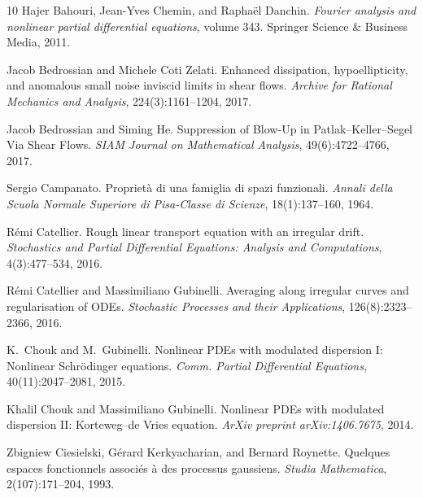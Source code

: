 \documentclass[11pt,oneside,reqno]{amsart}
\newcommand{\tmtextit}[1]{{{\itshape{#1}}}}
\numberwithin{equation}{section}
\begin{document}
\begin{thebibliography}{10}
  Hajer Bahouri, Jean-Yves Chemin, and  Rapha{\"e}l
  Danchin. {\newblock}\tmtextit{Fourier analysis and nonlinear partial
  differential equations},  volume  343. {\newblock}Springer Science \&
  Business Media, 2011.{\newblock}
  
  Jacob Bedrossian  and  Michele Coti
  Zelati. {\newblock}Enhanced dissipation, hypoellipticity, and anomalous
  small noise inviscid limits in shear flows. {\newblock}\tmtextit{Archive for
  Rational Mechanics and Analysis}, 224(3):1161--1204, 2017.{\newblock}
  
  Jacob Bedrossian  and  Siming He.
  {\newblock}Suppression of Blow-Up in Patlak--Keller--Segel Via Shear Flows.
  {\newblock}\tmtextit{SIAM Journal on Mathematical Analysis},
  49(6):4722--4766, 2017.{\newblock}
  
  Sergio Campanato. {\newblock}Propriet{\`a} di una
  famiglia di spazi funzionali. {\newblock}\tmtextit{Annali della Scuola
  Normale Superiore di Pisa-Classe di Scienze}, 18(1):137--160,
  1964.{\newblock}
  
  R{\'e}mi Catellier. {\newblock}Rough linear
  transport equation with an irregular drift. {\newblock}\tmtextit{Stochastics
  and Partial Differential Equations: Analysis and Computations},
  4(3):477--534, 2016.{\newblock}
  
  R{\'e}mi Catellier  and  Massimiliano
  Gubinelli. {\newblock}Averaging along irregular curves and regularisation of
  ODEs. {\newblock}\tmtextit{Stochastic Processes and their Applications},
  126(8):2323--2366, 2016.{\newblock}
  
  K.~Chouk  and  M.~Gubinelli.
  {\newblock}Nonlinear PDEs with modulated dispersion I: Nonlinear
  Schr{\"o}dinger equations. {\newblock}\tmtextit{Comm. Partial Differential
  Equations}, 40(11):2047--2081, 2015.{\newblock}
  
  Khalil Chouk  and  Massimiliano Gubinelli.
  {\newblock}Nonlinear PDEs with modulated dispersion II: Korteweg--de Vries
  equation. {\newblock}\tmtextit{ArXiv preprint arXiv:1406.7675},
  2014.{\newblock}
  
  Zbigniew Ciesielski, G{\'e}rard Kerkyacharian,
  and  Bernard Roynette. {\newblock}Quelques espaces fonctionnels associ{\'e}s
  {\`a} des processus gaussiens. {\newblock}\tmtextit{Studia Mathematica},
  2(107):171--204, 1993.{\newblock}
  

\end{thebibliography}
\end{document}
